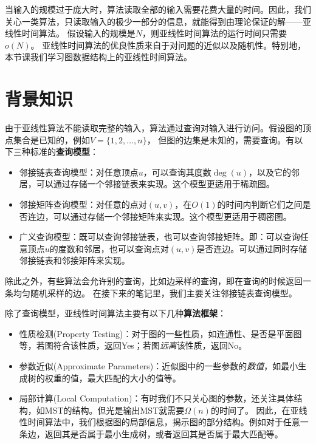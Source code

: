 \providecommand\numberthis{\addtocounter{equation}{1}\tag{\theequation}}

\providecommand{\avg}{\mathrm{avg}}
\providecommand{\ID}{\mathrm{ID}}

\providecommand*\circled[1]{\tikz[baseline=(char.base)]{
            \node[shape=circle,draw,inner sep=2pt] (char) {#1};}}


当输入的规模过于庞大时，算法读取全部的输入需要花费大量的时间。因此，我们关心一类算法，只读取输入的极少一部分的信息，就能得到由理论保证的解——亚线性时间算法。
假设输入的规模是$N$，则亚线性时间算法的运行时间只需要$o(N)$。
亚线性时间算法的优良性质来自于对问题的近似以及随机性。特别地，本节课我们学习图数据结构上的亚线性时间算法。

\section{背景知识}
由于亚线性算法不能读取完整的输入，算法通过查询对输入进行访问。假设图的顶点集合是已知的，例如$V=\{1,2,\dots,n\}$，
但图的边集是未知的，需要查询。有以下三种标准的\textbf{查询模型}：
\begin{itemize}
    \item 邻接链表查询模型：对任意顶点$u$，可以查询其度数$\deg(u)$，以及它的邻居，可以通过存储一个邻接链表来实现。这个模型更适用于稀疏图。
    \item 邻接矩阵查询模型：对任意的点对$(u,v)$，在$O(1)$的时间内判断它们之间是否连边，可以通过存储一个邻接矩阵来实现。这个模型更适用于稠密图。
    \item 广义查询模型：既可以查询邻接链表，也可以查询邻接矩阵。即：可以查询任意顶点$u$的度数和邻居，也可以查询点对$(u,v)$是否连边。可以通过同时存储邻接链表和邻接矩阵来实现。
\end{itemize}

除此之外，有些算法会允许别的查询，比如边采样的查询，即在查询的时候返回一条均匀随机采样的边。
在接下来的笔记里，我们主要关注邻接链表查询模型。

除了查询模型，亚线性时间算法主要有以下几种\textbf{算法框架}：
\begin{itemize}
    \item 性质检测(Property Testing)：对于图的一些性质，如连通性、是否是平面图等，若图符合该性质，返回Yes；若图\textit{远离}该性质，返回No。
    \item 参数近似(Approximate Parameters)：近似图中的一些参数的\textit{数值}，如最小生成树的权重的值，最大匹配的大小的值等。
    \item 局部计算(Local Computation)：有时我们不只关心图的参数，还关注具体结构，如MST的结构。但光是输出MST就需要$\Omega(n)$的时间了。
    因此，在亚线性时间算法中，我们根据图的局部信息，揭示图的部分结构。例如对于任意一条边，返回其是否属于最小生成树，或者返回其是否属于最大匹配等。
\end{itemize}

